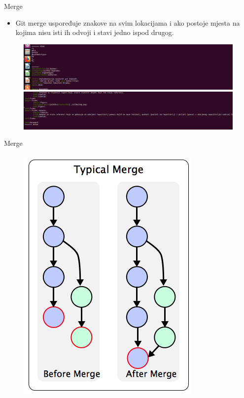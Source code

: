 \documentclass{beamer}
\begin{document}
\begin{frame}{Merge}
\begin{itemize}
	\item Git merge uspoređuje znakove na svim lokacijama i ako postoje mjesta na kojima nisu isti ih odvoji i stavi jedno ispod drugog.
\end{itemize}
\begin{figure}
		\centering
	\includegraphics[width=.6\textwidth]{./slike/merge1.png}
	\includegraphics[width=.6\textwidth]{./slike/merge2.png}
	\end{figure}
\end{frame}

\begin{frame}{Merge}
\begin{figure}
		\centering
	\includegraphics[width=.6\textwidth]{./slike/git_merge.png}
	\end{figure}
\end{frame}
\end{document}

